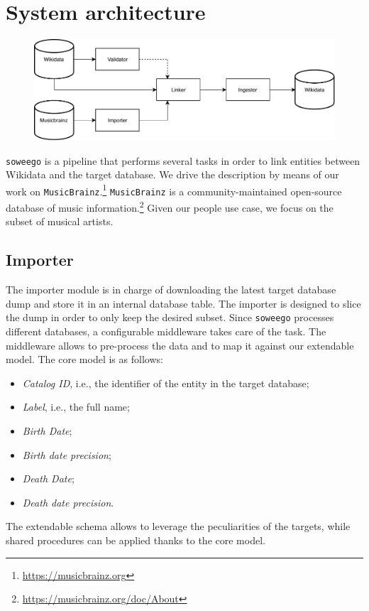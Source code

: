 \clearpage
\newpage

\chapter{System architecture}
\label{cha:4}

\begin{figure}[t]
  \begin{center}
   \includegraphics[width=\textwidth]{images/archi2.pdf}
   \label{fig:architecture}
  \end{center}
\end{figure}

\texttt{soweego} is a pipeline that performs several tasks in order to link entities between Wikidata and the target database. We drive the description by means of our work on \texttt{MusicBrainz}.\footnote{\url{https://musicbrainz.org}} \texttt{MusicBrainz} is a community-maintained open-source database of music information.\footnote{\url{https://musicbrainz.org/doc/About}} Given our people use case, we focus on the subset of musical artists.

\section{Importer}
\label{cha:41}
The importer module is in charge of downloading the latest target database dump and store it in an internal database table. The importer is designed to slice the dump in order to only keep the desired subset. Since \texttt{soweego} processes different databases, a configurable middleware takes care of the task. The middleware allows to pre-process the data and to map it against our extendable model. The core model is as follows:
\begin{itemize}
    \item \textit{Catalog ID}, i.e., the identifier of the entity in the target database;
    \item \textit{Label}, i.e., the full name;
    \item \textit{Birth Date};
    \item \textit{Birth date precision};
    \item \textit{Death Date};
    \item \textit{Death date precision}.
\end{itemize}
The extendable schema allows to leverage the peculiarities of the targets, while shared procedures can be applied thanks to the core model.

